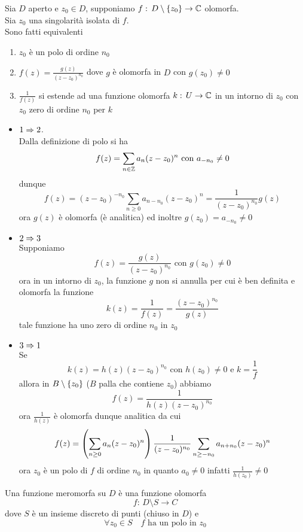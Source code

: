 \begin{prop}\bianco
Sia $D$ aperto e $z_0\in D$, supponiamo $f:\, D\setminus \left\{ z_0 \right\} \to \mathbb{C}$  olomorfa.\\
Sia $z_0$ una singolarit\`a isolata di $f$.\\
Sono fatti equivalenti
\begin{enumerate}
\item $z_0$ \`e un polo di ordine $n_0$
\item $f(z) = \frac{g(z)}{(z-z_0)^{n_0}} $ dove $g$ \`e olomorfa in $D$ con $g(z_0)\neq 0$
\item $\frac{1}{f(z)}$ si estende ad una funzione olomorfa $k:\, U \to \mathbb{C}$ in un intorno di $z_0$ con $z_0$ zero di ordine $n_0$ per $k$ 
\end{enumerate}
\proof\bbianco
\begin{itemize}
\item $1\Rightarrow 2$.\\
Dalla definizione di polo si ha 
$$ f(z) =\sum_{n\in \mathbb{Z}}a_n (z-z_0)^n \text{ con } a_{-n_0} \neq 0$$
dunque 
$$ f(z) = (z-z_0)^{-n_0} \sum_{n \geq 0 } a_{n-n_0} (z-z_0)^n =\frac{1}{ (z-z_0)^{n_0} } g(z)$$
ora $g(z)$ \`e olomorfa (\`e analitica) ed inoltre $g(z_0) =a_{-n_0} \neq 0$
\item $2\Rightarrow 3$\\
Supponiamo
$$ f(z) = \frac{g(z)}{(z-z_0)^{n_0}} \text{ con } g(z_0)\neq 0$$
ora in un intorno di $z_0$, la funzione $g$ non si annulla per cui \`e ben definita e olomorfa la funzione 
$$k(z) = \frac{1}{f(z)} = \frac{(z-z_0)^{n_0}}{g(z)}$$
tale funzione ha uno zero di ordine $n_0$ in $z_0$
\item $3\Rightarrow 1 $\\
Se $$k(z) = h(z) ( z-z_0)^{n_0} \text{ con } h(z_0)\neq 0 \text{ e } k = \frac{1}{f}$$
allora in $B \setminus\left\{ z_0 \right\}$ ($B$ palla che contiene $z_0$) abbiamo 
$$ f(z) =  \frac{1}{h(z) (z-z_0)^{n_0}}$$ 
ora $\frac{1}{h(z)}$ \`e olomorfa dunque analitica da cui 
$$ f(z) = \left( \sum_{n \geq 0} a_n (z-z_0)^n \right) \frac{1}{(z-z_0)^{n_0}} \sum_{n\geq -n_0} a_{n+n_0} (z-z_0)^n $$ 
ora $z_0$ \`e un polo di $f$ di ordine $n_0$ in quanto $a_0\neq 0$ infatti $\frac{1}{h(z_0)}\neq 0$
\end{itemize}
\end{prop}
\newpage
\begin{defn}Una funzione meromorfa su $D$ \`e una funzione olomorfa 
$$f:\, D\setminus S \to C$$
dove $S$ \`e un insieme discreto di punti (chiuso in $D$) e 
$$ \forall z_0\in S \quad f \text{ ha un polo in } z_0$$
\end{defn}

